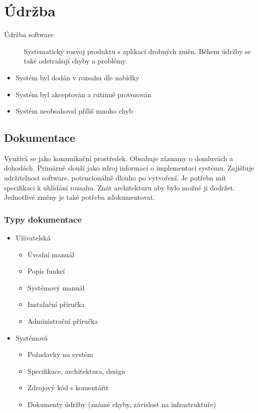 \section{Údržba}
  \begin{description}
    \item[Údržba software] Systematický rozvoj produktu s aplikací drobných změn. Během údržby se také odstraňují chyby a problémy.
  \end{description}

  \begin{itemize}
    \item Systém byl dodán v rozsahu dle nabídky
    \item Systém byl akceptován a rutinně provozován
    \item Systém neobsahoval příliš mnoho chyb
  \end{itemize}

  \subsection{Dokumentace}
    Využívá se jako komunikační prostředek. Obsahuje záznamy o domluvách a dohodách.
    Primárně slouží jako zdroj informací o implementaci systému.
    Zajišťuje udržitelnost software, potencionálně dlouho po vytvoření. Je potřeba mít specifikaci k uhlídání rozsahu.
    Znát architekturu aby bylo možné ji dodržet. Jednotlivé změny je také potřeba zdokumentovat.

    \subsubsection{Typy dokumentace}
    \begin{itemize}
      \item Uživatelská
        \begin{itemize}
          \item Úvodní manuál
          \item Popis funkcí
          \item Systémový manuál
          \item Instalační příručka
          \item Administrační příručka
        \end{itemize}
      \item Systémová
        \begin{itemize}
          \item Požadavky na systém
          \item Specifikace, architektura, design
          \item Zdrojový kód s komentářit
          \item Dokumenty údržby (známé chyby, závislost na infrastruktuře)
        \end{itemize}
    \end{itemize}


